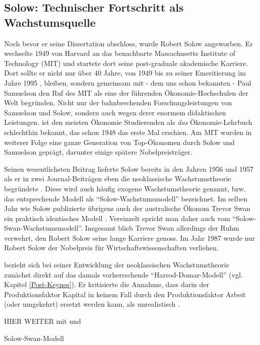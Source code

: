 \subsection{Solow: Technischer Fortschritt als Wachstumsquelle} \label{sec: Solow-Modell}
Noch bevor er seine Dissertation abschloss, wurde Robert Solow angeworben. Er wechselte 1949 von Harvard an das benachbarte Massachusetts Institute of Technology (MIT) und startete dort seine post-graduale akademische Karriere. Dort sollte er nicht nur über 40 Jahre, von 1949 bis zu seiner Emeritierung im Jahre 1995 \parencite{Solow1987a}, bleiben, sondern gemeinsam mit - dem uns schon bekannten - Paul Samuelson den Ruf des MIT als eine der führenden Ökonomie-Hochschulen der Welt begründen. Nicht nur der bahnbrechenden Forschungsleistungen von Samuelson und Solow, sondern auch wegen derer enormem didaktischen Leistungen. \textcite{Samuelson1998} ist den meisten Ökonomie Studierenden als \textit{das} Ökonomie-Lehrbuch schlechthin bekannt, das schon 1948 das erste Mal erschien. Am MIT wurden in weiterer Folge eine ganze Generation von Top-Ökonomen durch Solow und Samuelson geprägt, darunter einige spätere Nobelpreisträger.

Seinen wesentlichsten Beitrag lieferte Solow bereits in den Jahren 1956 und 1957 als er in zwei Journal-Beiträgen eben die neoklassische Wachstumstheorie begründete \parencite{Solow1956, Solow1957}. Diese wird auch häufig exogene Wachstumstheorie genannt, bzw. das entsprechende Modell als "`Solow-Wachstumsmodell"' bezeichnet. Im selben Jahr wie Solow publizierte übrigens auch der australische Ökonom Trevor Swan ein praktisch identisches Modell \parencite{Swan1956}. Vereinzelt spricht man daher auch vom "`Solow-Swan-Wachstumsmodell"'. Insgesamt blieb Trevor Swan allerdings der Ruhm verwehrt, den Robert Solow seine lange Karriere genoss. Im Jahr 1987 wurde nur Robert Solow der Nobelpreis für Wirtschaftswissenschaften verliehen. 

\textcite{Solow1956} bezieht sich bei seiner Entwicklung der neoklassischen Wachstumstheorie zunächst direkt auf das damals vorherrschende "`Harrod-Domar-Modell"' (vgl. Kapitel \ref{Post-Keynes}). Er kritisierte die Annahme, dass darin der Produktionsfaktor Kapital in keinem Fall durch den Produktionsfaktor Arbeit (oder umgekehrt) ersetzt werden kann, als unrealistisch \parencite[S. 65]{Solow1956}.


HIER WEITER mit \textcite{Solow1956} und \textcite{Snowdon2005}


Solow-Swan-Modell

